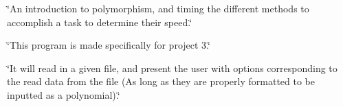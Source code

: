 \char`\"{}\-An introduction to polymorphism, and timing the different methods to accomplish a task to determine their speed.\char`\"{} \par
\char`\"{}\-This program is made specifically for project 3.\char`\"{} \par
\char`\"{}\-It will read in a given file, and present the user with options corresponding to the read data from the file (\-As long as they are properly formatted to be inputted as a polynomial).\char`\"{} 